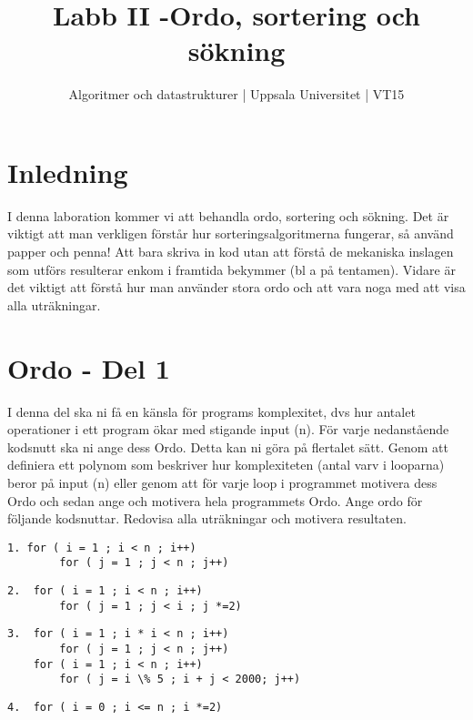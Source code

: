 \documentclass{article}
\begin{document}
  \title{Labb II -Ordo, sortering och sökning }
  \author{ Algoritmer och datastrukturer | Uppsala Universitet | VT15 }
  \date{}
  \maketitle


  \section*{Inledning}
   I denna laboration kommer vi att behandla ordo, sortering och sökning. Det är viktigt att
   man verkligen förstår hur sorteringsalgoritmerna fungerar, så använd papper och penna!
   Att bara skriva in kod utan att förstå de mekaniska inslagen som utförs resulterar enkom i
   framtida bekymmer (bl a på tentamen). Vidare är det viktigt att förstå hur man använder
   stora ordo och att vara noga med att visa alla uträkningar. 



  \section*{Ordo - Del 1
  }

  I denna del ska ni få en känsla för programs komplexitet, dvs hur antalet operationer i ett
  program ökar med stigande input (n). För varje nedanstående kodsnutt ska ni ange dess
  Ordo. Detta kan ni göra på flertalet sätt. Genom att definiera ett polynom som beskriver
  hur komplexiteten (antal varv i looparna) beror på input (n) eller genom att för varje loop
  i programmet motivera dess Ordo och sedan ange och motivera hela programmets Ordo.
  Ange ordo för följande kodsnuttar. Redovisa alla uträkningar och motivera
  resultaten.
  
  
   \begin{lstlisting}
1. for ( i = 1 ; i < n ; i++)
		for ( j = 1 ; j < n ; j++)
    \end{lstlisting}
    
    \begin{lstlisting}     
2.	for ( i = 1 ; i < n ; i++)
		for ( j = 1 ; j < i ; j *=2) 
    \end{lstlisting}
    \begin{lstlisting}
3.	for ( i = 1 ; i * i < n ; i++)
		for ( j = 1 ; j < n ; j++) 
    for ( i = 1 ; i < n ; i++)
		for ( j = i \% 5 ; i + j < 2000; j++) 
    \end{lstlisting} 
    \begin{lstlisting}   
4.	for ( i = 0 ; i <= n ; i *=2)
    \end{lstlisting}
\end{document}
